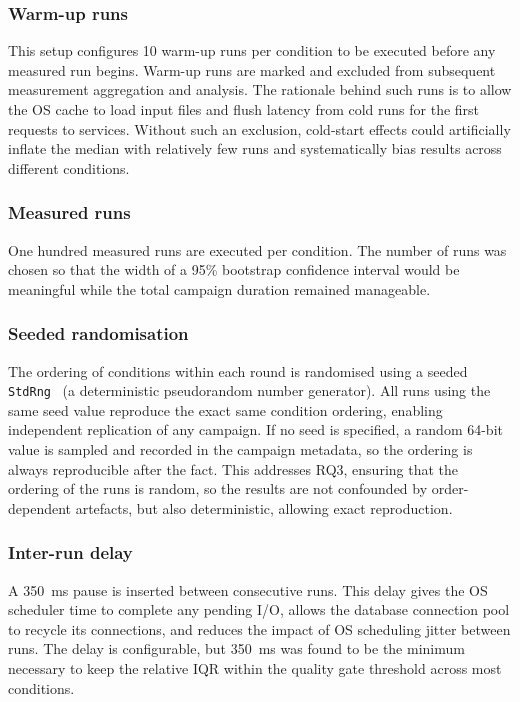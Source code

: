 \documentclass[12pt,a4paper]{article}
\begin{document}
\subsubsection{Warm-up runs} This setup configures 10 warm-up runs per condition to be executed before any measured run begins. Warm-up runs are marked and excluded from subsequent measurement aggregation and analysis. The rationale behind such runs is to allow the OS cache to load input files and flush latency from cold runs for the first requests to services. Without such an exclusion, cold-start effects could artificially inflate the median with relatively few runs and systematically bias results across different conditions.

\subsubsection{Measured runs} One hundred measured runs are executed per condition. The number of runs was chosen so that the width of a 95\% bootstrap confidence interval would be meaningful while the total campaign duration remained manageable.

\subsubsection{Seeded randomisation} The ordering of conditions within each round is randomised using a seeded \texttt{StdRng}~\cite{rust-rand-crate} (a deterministic pseudorandom number generator). All runs using the same seed value reproduce the exact same condition ordering, enabling independent replication of any campaign. If no seed is specified, a random 64-bit value is sampled and recorded in the campaign metadata, so the ordering is always reproducible after the fact. This addresses RQ3, ensuring that the ordering of the runs is random, so the results are not confounded by order-dependent artefacts, but also deterministic, allowing exact reproduction.

\subsubsection{Inter-run delay} A 350~ms pause is inserted between consecutive runs. This delay gives the OS scheduler time to complete any pending I/O, allows the database connection pool to recycle its connections, and reduces the impact of OS scheduling jitter between runs. The delay is configurable, but 350~ms was found to be the minimum necessary to keep the relative IQR within the quality gate threshold across most conditions.
\end{document}
